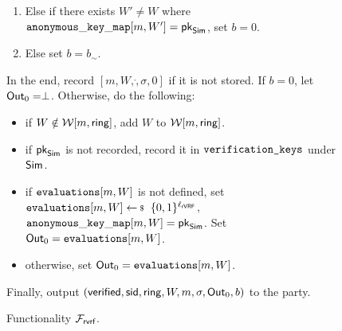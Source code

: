 \begin{figure}
\begin{tcolorbox}[left=2pt,right=2pt]
{\begin{list}{\hspace*{1pt} C}{,\setlength\leftmargin{0.15in}}
\begin{enumerate}
					\item Else if there exists $ W' \neq W $ where  $ \mathtt{anonymous\_key\_map}[m,W'] = \mathsf{pk}_{\mathsf{Sim}} $, set $ b = 0 $. \label{cond:differentWforsamepk}
					\item Else set $ b = b_\sim$. \label{cond:simulatorbit}
				\end{enumerate}		

			\end{list}
			In the end,  record $ [m,W,\ring,\sigma, 0] $ if it is not stored. If $ b = 0 $, let $ {\mathsf{Out}}_0 = \perp $. Otherwise,   do the following:
			\begin{itemize}
				\item if $ W \notin \mathcal{W}[m,\mathsf{ring}] $, add $ W $ to $ \mathcal{W}[m,\mathsf{ring}]  $.
				\item if $ \mathsf{pk}_{\mathsf{Sim}} $ is not recorded, record it in $ \texttt{verification\_keys} $ under $ \mathsf{Sim} $.
				\item if $ \texttt{evaluations}[m,W] $ is not defined, set $ \evaluationslist[m, W]\leftsample \bin^{\ell_\rVRF}$, $ \mathtt{anonymous\_key\_map}[m,W]  = \mathsf{pk}_{\mathsf{Sim}}$.  Set $ {\mathsf{Out}}_0 = \texttt{evaluations}[m, W]$.
				\item otherwise, set $ {\mathsf{Out}}_0 = \texttt{evaluations}[m, W]$. 	
			\end{itemize}
			Finally, output $(\mathsf{verified}, \textsf{sid}, \mathsf{ring},W, m, \sigma, {\mathsf{Out}}_0, b)$ to the party.
			
	

	}
\end{tcolorbox}
\caption{Functionality $\mathcal{F}_{\textsf{rvrf}}$.\label{f:gvrf}}
\end{figure}



